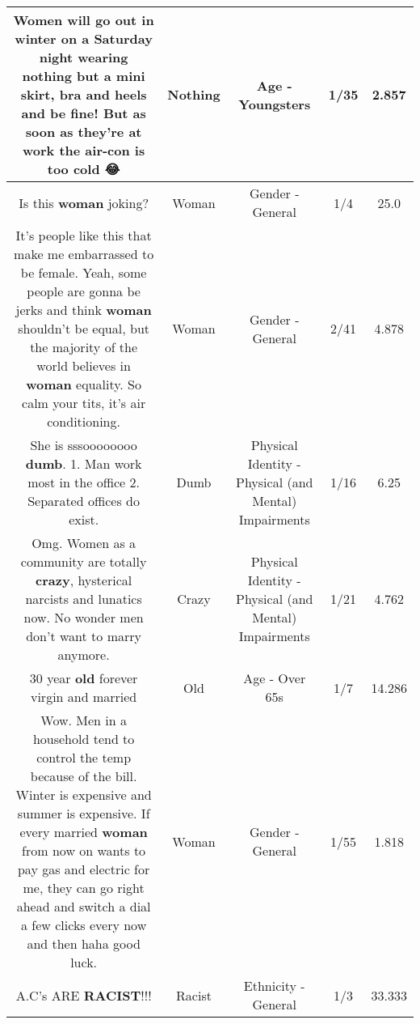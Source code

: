 \documentclass[11pt]{article}
\newlength\mylength
\begin{document}
\begin{center}
\begin{longtable}{|C{.65\mylength}|C{.30\mylength}|C{.12\mylength}|C{.12\mylength}|C{.12\mylength}|}
  \small Women will go out in winter on a Saturday night wearing \textbf{nothing} but a mini skirt, bra and heels and be fine! But as soon as they're at work the air-con is too cold 😂\normalsize   & Nothing & Age - Youngsters & 1/35 & 2.857 \\  \hline
  \small Is this \textbf{woman} joking?\normalsize   & Woman & Gender - General & 1/4 & 25.0 \\  \hline
  \small It's people like this that make me embarrassed to be female. Yeah, some people are gonna be jerks and think \textbf{woman} shouldn't be equal, but the majority of the world believes in \textbf{woman} equality. So calm your tits, it's air conditioning.\normalsize   & Woman & Gender - General & 2/41 & 4.878 \\  \hline
  \small She is sssoooooooo \textbf{dumb}. 1. Man work most in the office 2. Separated offices do exist.\normalsize   & Dumb & Physical Identity - Physical (and Mental) Impairments & 1/16 & 6.25 \\  \hline
  \small Omg. Women as a community are totally \textbf{crazy}, hysterical narcists and lunatics now. No wonder men don't want to marry anymore.\normalsize   & Crazy & Physical Identity - Physical (and Mental) Impairments & 1/21 & 4.762 \\  \hline
  \small 30 year \textbf{old} forever virgin and married\normalsize   & Old & Age - Over 65s & 1/7 & 14.286 \\  \hline
  \small Wow. Men in a household tend to control the temp because of the bill. Winter is expensive and summer is expensive. If every married \textbf{woman} from now on wants to pay gas and electric for me, they can go right ahead and switch a dial a few clicks every now and then haha good luck.\normalsize   & Woman & Gender - General & 1/55 & 1.818 \\  \hline
  \small A.C's ARE \textbf{RACIST}!!!\normalsize   & Racist & Ethnicity - General & 1/3 & 33.333 \\  \hline

\end{longtable}
\end{center}
\end{document}
